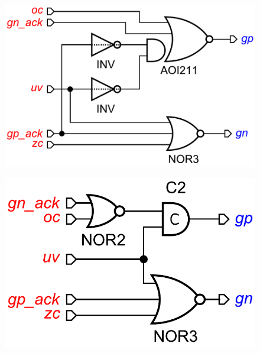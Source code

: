 \documentclass[british, journal]{IEEEtran}
\begin{document}
\begin{figure}[H]
	\begin{centering}
		\includegraphics[scale=0.35]{Images/circuit-buck-mapped-pfy-wc.pdf}
		\par\end{centering}
	
\end{figure}

\begin{figure}[H]
	\begin{centering}
		\includegraphics[scale=0.35]{Images/circuit-buck-deco2-wc}
		\par\end{centering}
\end{figure}
\end{document}
